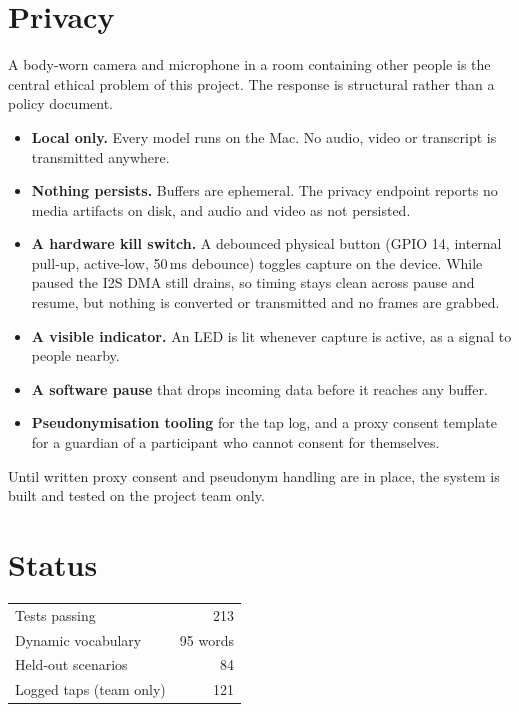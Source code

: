 \documentclass[11pt,a4paper]{article}
\begin{document}
\section{Privacy}

A body-worn camera and microphone in a room containing other people is the central
ethical problem of this project. The response is structural rather than a policy
document.

\begin{itemize}
  \item \textbf{Local only.} Every model runs on the Mac. No audio, video or transcript
  is transmitted anywhere.
  \item \textbf{Nothing persists.} Buffers are ephemeral. The privacy endpoint
  reports no media artifacts on disk, and audio and video as not persisted.
  \item \textbf{A hardware kill switch.} A debounced physical button (GPIO 14, internal
  pull-up, active-low, 50\,ms debounce) toggles capture on the device. While paused the
  I2S DMA still drains, so timing stays clean across pause and resume, but nothing is
  converted or transmitted and no frames are grabbed.
  \item \textbf{A visible indicator.} An LED is lit whenever capture is active, as a
  signal to people nearby.
  \item \textbf{A software pause} that drops incoming data before it reaches any buffer.
  \item \textbf{Pseudonymisation tooling} for the tap log, and a proxy consent template
  for a guardian of a participant who cannot consent for themselves.
\end{itemize}

Until written proxy consent and pseudonym handling are in place, the system is built and
tested on the project team only.

\section{Status}

\begin{center}
\begin{tabular}{@{}lr@{}}
\toprule
Tests passing              & 213 \\
Dynamic vocabulary         & 95 words \\
Held-out scenarios         & 84 \\
Logged taps (team only)    & 121 \\
\bottomrule
\end{tabular}
\end{center}
\end{document}

